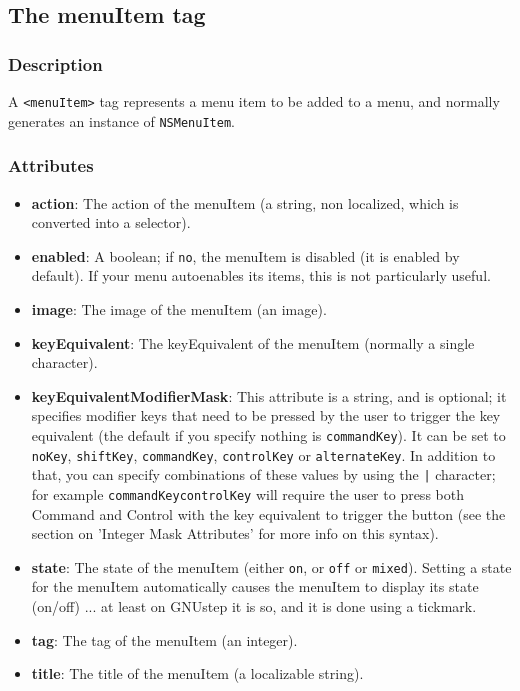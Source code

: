 \subsection{The menuItem tag}

\subsubsection{Description}
A \texttt{<menuItem>} tag represents a menu item to be added to a menu,
and normally generates an instance of \texttt{NSMenuItem}.

\subsubsection{Attributes}
\begin{itemize}
\item {\bf action}: The action of the menuItem (a string, non
  localized, which is converted into a selector).
\item {\bf enabled}: A boolean; if \texttt{no}, the menuItem is
  disabled (it is enabled by default).  If your menu autoenables its
  items, this is not particularly useful.
\item {\bf image}: The image of the menuItem (an image).
\item {\bf keyEquivalent}: The keyEquivalent of the menuItem (normally
  a single character).
\item {\bf keyEquivalentModifierMask}: This attribute is a string, and
  is optional; it specifies modifier keys that need to be pressed by
  the user to trigger the key equivalent (the default if you specify
  nothing is \texttt{commandKey}).  It can be set to \texttt{noKey},
  \texttt{shiftKey}, \texttt{commandKey}, \texttt{controlKey} or
  \texttt{alternateKey}.  In addition to that, you can specify
  combinations of these values by using the \texttt{|} character; for
  example \texttt{commandKey\discretionary{|}{}{|}controlKey} will
  require the user to press both Command and Control with the key
  equivalent to trigger the button (see the section on 'Integer Mask
  Attributes' for more info on this syntax).
\item {\bf state}: The state of the menuItem (either \texttt{on}, or
  \texttt{off} or \texttt{mixed}).  Setting a state for the menuItem
  automatically causes the menuItem to display its state (on/off)
  ... at least on GNUstep it is so, and it is done using a tickmark.
\item {\bf tag}: The tag of the menuItem (an integer).
\item {\bf title}: The title of the menuItem (a localizable string).
\end{itemize}

